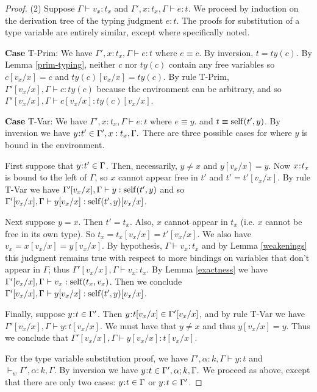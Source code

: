 \documentclass[11pt]{article}
\newcommand{\al}{\alpha}
\newcommand{\bind}{\hspace{0.05em}{:}\hspace{0.05em}} %
\begin{document}
\begin{proof}
(2) Suppose $\Gamma \vdash v_x:t_x$ and $\Gamma', x:t_x ,\Gamma \vdash e : t$. We proceed by induction on the derivation tree of the typing judgment $e:t$. The proofs for substitution of a type variable are entirely similar, except where specifically noted.

{\bf Case} {\sc T-Prim}: We have $\Gamma', x:t_x,\Gamma \vdash e : t$ where $e \equiv c$. By inversion, $t = ty(c)$. By Lemma \ref{prim-typing}, neither $c$ nor $ty(c)$ contain any free variables so $c[v_x/x] = c$ and $ty(c)[v_x/x] = ty(c)$.
By rule {\sc T-Prim},
$\Gamma'[v_x/x],\Gamma \vdash c : ty(c)$ 
because the environment can be arbitrary,
and so
$\Gamma'[v_x/x],\Gamma \vdash c[v_x/x] : ty(c)[v_x/x]$.

{\bf Case} {\sc T-Var}: We have $\Gamma', x:t_x,\Gamma \vdash e : t$ where $e \equiv y$. and $t\equiv {\rm self}(t', y)$. By inversion we have $y\bind t' \in \Gamma', x:t_x,\Gamma.$ There are three possible cases for where $y$ is bound in the environment.

First suppose that $y\bind t' \in \Gamma$. Then, necessarily, $y\neq x$ and $y[v_x/x] = y.$ Now $x\bind t_x$ is bound to the left of $\Gamma$, so $x$ cannot appear free in $t'$ and $t' = t'[v_x/x]$. By rule {\sc T-Var} we have $\Gamma'[v_x/x], \Gamma \vdash y : {\rm self}(t',y)$ and so $\Gamma'[v_x/x], \Gamma \vdash y[v_x/x] : {\rm self}(t',y)[v_x/x] $.

Next suppose $y = x$. Then $t' = t_x$. Also, $x$ cannot appear in $t_x$ (i.e. $x$ cannot be free in its own type). So $t_x = t_x[v_x/x] = t'[v_x/x]$. We also have $v_x = x[v_x/x] = y[v_x/x]$.
By hypothesis, $\Gamma \vdash v_x : t_x$ and by Lemma \ref{weakenings} this judgment remains true with respect to more bindings on variables that don't appear in $\Gamma$; thus $\Gamma'[v_x/x], \Gamma \vdash v_x : t_x$. By Lemma \ref{exactness} we have $\Gamma'[v_x/x],\Gamma\vdash v_x : {\rm self}(t_x,v_x)$.
Then we conclude $\Gamma'[v_x/x], \Gamma \vdash y[v_x/x] : {\rm self}(t',y)[v_x/x]$.

Finally, suppose  $y\bind t \in \Gamma'$. Then $y\bind t[v_x/x] \in \Gamma'[v_x/x]$, and by rule {\sc T-Var} we have $\Gamma'[v_x/x], \Gamma \vdash y : t[v_x/x]$. We must have that $y\neq x$ and thus $y[v_x/x] = y$. Thus we conclude that $\Gamma'[v_x/x], \Gamma \vdash y[v_x/x] : t[v_x/x]$.

For the type variable substitution proof, we have $\Gamma', \al:k,\Gamma \vdash y : t$ and $\vdash_w \Gamma', \al:k,\Gamma$. By inversion we have $y\bind t \in \Gamma', \al;k ,\Gamma.$ We proceed as above, except that there are only two cases: $y\bind t \in \Gamma$ or $y\bind t \in \Gamma'$.


\end{proof}
\end{document}
